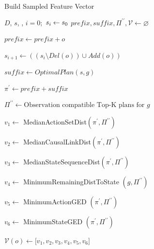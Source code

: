 \begin{algorithm}[ht]
        \caption{Build Sampled Feature Vector}
        \label{alg:apx}
        \begin{algorithmic}[1]
                \Require $D$, $s$, \undesired, \desired
                \State $i=0;$ $ s_{i} \gets s_0$
                \State $prefix,suffix,\Pi^{\prime\prime}, \mathcal{V} \gets \varnothing$
                        \State \parbox[t]{0.95\linewidth}{$prefix \gets prefix + o$}
                        \State \parbox[t]{0.95\linewidth} 
                                {$s_{i+1} \gets ((s_{i} \setminus Del(o))\cup Add(o))$}
                                \State \parbox[t]{0.95\linewidth}{$suffix \gets OptimalPlan(s,g)$}
                                \State \parbox[t]{0.95\linewidth}{$\pi^\prime \gets prefix + suffix$}
                                \State \parbox[t]{0.95\linewidth}{$\Pi^{\prime\prime} \gets \text{Observation compatible Top-K plans for } g$}
                                \State \parbox[t]{0.95\linewidth}{$v_1 \gets$ MedianActionSetDist$(\pi^\prime, \Pi^{\prime\prime})$}
                                \State \parbox[t]{0.95\linewidth}{$v_2 \gets$ MedianCausalLinkDist$(\pi^\prime, \Pi^{\prime\prime})$}
                                \State \parbox[t]{0.95\linewidth}{$v_3 \gets$ MedianStateSequenceDist$(\pi^\prime,\Pi^{\prime\prime})$}
                                \State \parbox[t]{0.95\linewidth}{$v_4 \gets$ MinimumRemainingDistToState $(g,\Pi^{\prime\prime})$}
                                \State \parbox[t]{0.95\linewidth}{$v_5 \gets$ MinimumActionGED $(\pi^\prime, \Pi^{\prime\prime})$}
                                \State \parbox[t]{0.95\linewidth}{$v_6 \gets$ MinimumStateGED $(\pi^\prime, \Pi^{\prime\prime})$}
                                \State $\mathcal{V}(o) \gets \lbrack v_1,v_2,v_3,v_4,v_5,v_6\rbrack $
                        \EndFor
                \EndFor
                \EndProcedure
        \end{algorithmic}
\end{algorithm}

